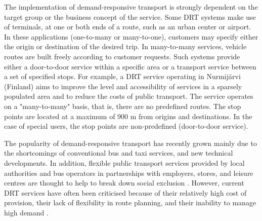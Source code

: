 \documentclass[dissertation,draft*]{aaltoseries}
\begin{document}


The implementation of demand-responsive transport is strongly dependent on the target group
or the business concept of the service. 
Some DRT systems make use of terminals, at one or both ends of a route, such as an urban center or airport.
In these applications (one-to-many or many-to-one), customers may specify either the origin or destination of the 
desired trip. 
In many-to-many services, vehicle routes are built freely according to customer requests.
Such systems provide either a door-to-door service within a specific area or
a transport service between a set of specified stops. 
For example, a DRT service operating in Nurmij\"arvi (Finland) aims to improve the level and
accessibility of services in a sparsely populated area and
to reduce the costs of public transport. The service operates on
a "many-to-many" basis, that is, there are no predefined routes. 
The stop points are located at a maximum of
900 m from origins and destinations. In the case of
special users, the stop points are non-predefined (door-to-door service). 


The popularity of demand-responsive transport has recently grown
mainly due to the shortcomings of conventional
bus and taxi services, and new technical developments.
In addition, flexible public transport services provided by local authorities and bus operators in
partnerships with employers, stores, and leisure centres are thought to help to break down social exclusion \cite{detr}.
However, current DRT services have often been
criticised because of their relatively high cost of provision,
their lack of flexibility in route planning, and their
inability to manage high demand \cite{mageean}. 
\end{document}
